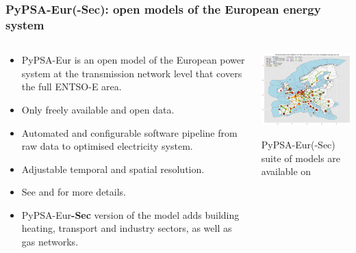 \begin{frame}
  \frametitle{PyPSA-Eur(-Sec): open models of the European energy system}

  \begin{columns}[T]
  \begin{column}{7cm}
  {\small
  \begin{itemize}
  \item PyPSA-Eur is an open model of the European power system at the transmission network 
  level that covers the full ENTSO-E area.
  \item Only freely available and open data.
  \item Automated and configurable software pipeline from raw data to optimised electricity system.
  \item Adjustable temporal and spatial resolution.
  \item See 
  and  
  for more details.
  \item PyPSA-Eur{\bf-Sec} version of the model adds building heating, transport and industry sectors, as well as gas networks.
  \end{itemize}
  }
  \end{column}

  \begin{column}{9cm}
    \centering
  {\footnotesize
    \includegraphics[width=8cm]{images/elec_s_100.png}
  
   \vspace{0.1cm}
   PyPSA-Eur(-Sec) suite of models are available on 
  }
  \end{column}
  
  \end{columns}

\end{frame}



